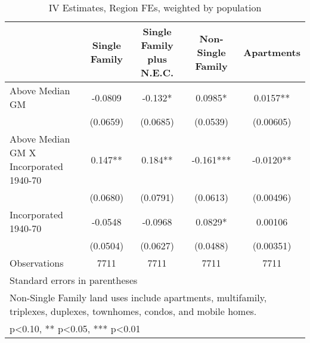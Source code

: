 \begin{table}[htbp]\centering
\def\sym#1{\ifmmode^{#1}\else\(^{#1}\)\fi}
\caption{IV Estimates, Region FEs, weighted by population}
\begin{tabular}{l*{4}{c}}
\toprule
                    &\multicolumn{1}{c}{Single Family}&\multicolumn{1}{c}{Single Family plus N.E.C.}&\multicolumn{1}{c}{Non-Single Family}&\multicolumn{1}{c}{Apartments}\\
\midrule
Above Median GM     &     -0.0809   &      -0.132*  &      0.0985*  &      0.0157** \\
                    &    (0.0659)   &    (0.0685)   &    (0.0539)   &   (0.00605)   \\
\addlinespace
Above Median GM X Incorporated 1940-70&       0.147** &       0.184** &      -0.161***&     -0.0120** \\
                    &    (0.0680)   &    (0.0791)   &    (0.0613)   &   (0.00496)   \\
\addlinespace
Incorporated 1940-70&     -0.0548   &     -0.0968   &      0.0829*  &     0.00106   \\
                    &    (0.0504)   &    (0.0627)   &    (0.0488)   &   (0.00351)   \\
\midrule
Observations        &        7711   &        7711   &        7711   &        7711   \\
\bottomrule
\multicolumn{5}{l}{\footnotesize Standard errors in parentheses}\\
\multicolumn{5}{l}{\footnotesize Non-Single Family land uses include apartments, multifamily, triplexes, duplexes, townhomes, condos, and mobile homes.}\\
\multicolumn{5}{l}{\footnotesize * p<0.10, ** p<0.05, *** p<0.01}\\
\end{tabular}
\end{table}
